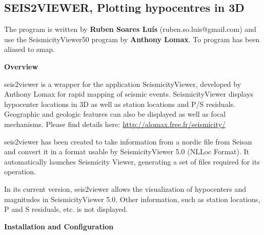 
\subsection{SEIS2VIEWER, Plotting hypocentres in 3D}
\label{subs:seis2viewer}
\label{page:seis2viewer}

The program is written by \textbf{Ruben Soares Lu\'is} (ruben.so.luis@gmail.com) and use 
the SeismicityViewer50 program by \textbf{Anthony Lomax}. To program has been aliased to smap.


\textbf{Overview}

seis2viewer is a wrapper for the application SeismicityViewer, developed by Anthony Lomax for rapid mapping of seismic events. SeismicityViewer displays hypocenter locations in 3D as well as station locations and P/S residuals. Geographic and geologic features can also be displayed as well as focal mechanisms. Please find details here:\newline
\url{http://alomax.free.fr/seismicity/}

seis2viewer has been created to take information from a nordic file from Seisan and convert it in a format usable by SeismicityViewer 5.0 (NLLoc Format). It automatically launches Seismicity Viewer, generating a set of files required for its operation.

In its current version, seis2viewer allows the visualization of hypocenters and magnitudes in SeismicityViewer 5.0. Other information, such as station locations, P and S residuals, etc. is not displayed.


\textbf{Installation and Configuration}

